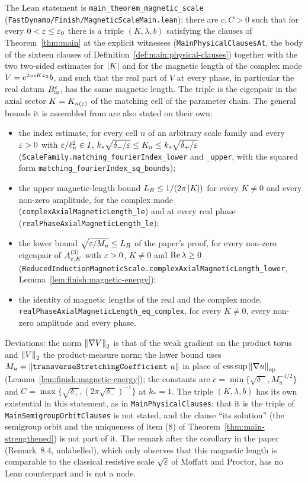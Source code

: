 The Lean statement is \texttt{main\_theorem\_magnetic\_scale}
(\texttt{FastDynamo/Finish/MagneticScaleMain.lean}): there are $c,C>0$ such that for every
$0<\varepsilon\leq\varepsilon_0$ there is a triple $(K,\lambda,b)$ satisfying the clauses of
Theorem~\ref{thm:main} at the explicit witnesses (\texttt{MainPhysicalClausesAt}, the body of
the sixteen clauses of Definition~\ref{def:main:physical-clauses}) together with the two
two-sided estimates for $\left\lvert K\right\rvert$ and for the magnetic length of the complex mode
$V=\mathrm{e}^{2\pi iKx_3}b$, and such that the real part of $V$ at every phase, in particular the real
datum $B_{\rm in}^\varepsilon$, has the same magnetic length.  The triple is the eigenpair in the axial
sector $K=K_{n(\varepsilon)}$ of the matching cell of the parameter chain.  The general bounds it is
assembled from are also stated on their own:
\begin{itemize}
  \item the index estimate, for every cell $n$ of an arbitrary scale family and every
    $\varepsilon>0$ with $\varepsilon/\ell_n^2\in I$,
    $k_*\sqrt{\delta_-/\varepsilon}\leq K_n\leq k_*\sqrt{\delta_+/\varepsilon}$
    (\texttt{ScaleFamily.matching\_fourierIndex\_lower} and \texttt{\_upper}, with the squared
    form \texttt{matching\_fourierIndex\_sq\_bounds});
  \item the upper magnetic-length bound $L_B\leq1/(2\pi\left\lvert K\right\rvert)$ for every $K\neq0$ and every
    non-zero amplitude, for the complex mode (\texttt{complexAxialMagneticLength\_le}) and at
    every real phase (\texttt{realPhaseAxialMagneticLength\_le});
  \item the lower bound $\sqrt{\varepsilon/M_u}\leq L_B$ of the paper's proof, for every non-zero
    eigenpair of $A^{(3)}_{\varepsilon,K}$ with $\varepsilon>0$, $K\neq0$ and $\operatorname{Re}\lambda\geq0$
    (\texttt{ReducedInductionMagneticScale.complexAxialMagneticLength\_lower},
    Lemma~\ref{lem:finish:magnetic-energy});
  \item the identity of magnetic lengths of the real and the complex mode,
    \texttt{realPhaseAxialMagneticLength\_eq\_complex}, for every $K\neq0$, every non-zero
    amplitude and every phase.
\end{itemize}
Deviations: the norm $\left\|\nabla V\right\|_2$ is that of the weak gradient on the product torus and
$\left\|V\right\|_2$ the product-measure norm; the lower bound uses
$M_u=\norm{\texttt{transverseStretchingCoefficient}\ u}$ in place of
$\mathrm{ess\,sup}\left\|\nabla u\right\|_{\rm op}$ (Lemma~\ref{lem:finish:magnetic-energy}); the
constants are $c=\min\{\sqrt{\delta_-},M_u^{-1/2}\}$ and
$C=\max\{\sqrt{\delta_+},(2\pi\sqrt{\delta_-})^{-1}\}$ at $k_*=1$.  The triple $(K,\lambda,b)$
has its own existential in this statement, as in \texttt{MainPhysicalClauses}: that it is the
triple of \texttt{MainSemigroupOrbitClauses} is not stated, and the clause ``its solution'' (the
semigroup orbit and the uniqueness of item (8) of Theorem~\ref{thm:main-strengthened}) is not
part of it.  The remark after the
corollary in the paper (Remark~8.4, unlabelled), which only observes that this magnetic length is
comparable to the classical resistive scale $\sqrt{\varepsilon}$ of Moffatt and Proctor, has no Lean
counterpart and is not a node.

